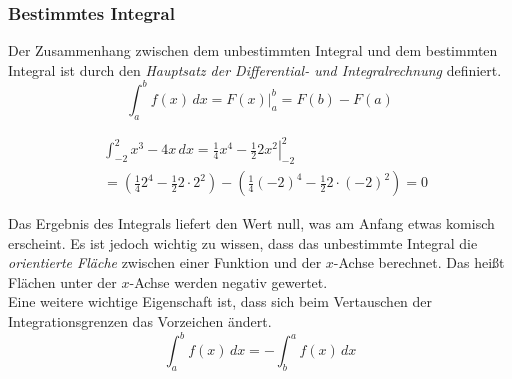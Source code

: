 \subsubsection{Bestimmtes Integral}
Der Zusammenhang zwischen dem unbestimmten Integral und dem bestimmten Integral ist durch den \emph{Hauptsatz der Differential- und Integralrechnung} definiert.
\begin{equation}
    \int_a^b f(x)\,dx = F(x) \big|_a^b = F(b)-F(a)
\end{equation}

\begin{bsp}
\begin{align*}
    &\int_{-2}^2 x^3-4x \, dx = \left .\frac{1}{4} x^4 - \frac{1}{2}2x^2 \right|_{-2}^{2} \\[5pt]
    &= \left( \frac{1}{4} 2^4 - \frac{1}{2}2\cdot 2^2 \right) - \left( \frac{1}{4} (-2)^4 - \frac{1}{2}2\cdot(-2)^2 \right) = 0
\end{align*}
\end{bsp}
\noindent
Das Ergebnis des Integrals liefert den Wert null, was am Anfang etwas komisch erscheint.
Es ist jedoch wichtig zu wissen, dass das unbestimmte Integral die \emph{orientierte Fläche} zwischen einer Funktion und der $x$-Achse berechnet. Das heißt Flächen unter der $x$-Achse werden negativ gewertet. \\
Eine weitere wichtige Eigenschaft ist, dass sich beim Vertauschen der Integrationsgrenzen das Vorzeichen ändert.
\begin{equation}
    \int_a^b f(x)\,dx = -\int_b^a f(x)\,dx 
\end{equation}

